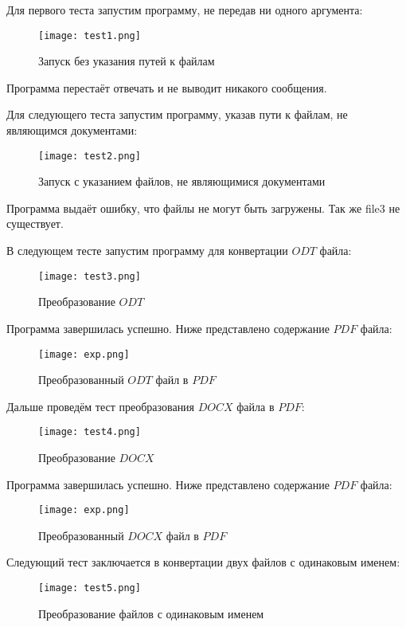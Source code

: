 \documentclass[12pt]{article}
\begin{document}
    Для первого теста запустим программу, не передав ни одного аргумента:
    \begin{figure}[h]
        \texttt{[image: test1.png]}
        \centering
        \caption{Запуск без указания путей к файлам}
    \end{figure}

    Программа перестаёт отвечать и не выводит никакого сообщения.

    Для следующего теста запустим программу, указав пути к файлам, не являющимся документами:
    \begin{figure}[h]
        \texttt{[image: test2.png]}
        \centering
        \caption{Запуск  с  указанием файлов, не являющимися документами}
    \end{figure}

    Программа выдаёт ошибку, что файлы не могут быть загружены. Так же file3 не существует.

    В следующем тесте запустим программу для конвертации $ODT$ файла:
    \begin{figure}[h]
        \texttt{[image: test3.png]}
        \centering
        \caption{Преобразование $ODT$}
    \end{figure}

    \newpage
    Программа завершилась успешно. Ниже представлено содержание $PDF$ файла:
    \begin{figure}[h]
        \texttt{[image: exp.png]}
        \centering
        \caption{Преобразованный $ODT$ файл в $PDF$}
    \end{figure}

    \newpage
    Дальше проведём тест преобразования $DOCX$ файла в $PDF$:
    \begin{figure}[h]
        \texttt{[image: test4.png]}
        \centering
        \caption{Преобразование $DOCX$}
    \end{figure}

    Программа завершилась успешно. Ниже представлено содержание $PDF$ файла:
    \begin{figure}[h]
        \texttt{[image: exp.png]}
        \centering
        \caption{Преобразованный $DOCX$ файл в $PDF$}
    \end{figure}

    \newpage
    Следующий тест заключается в конвертации двух файлов с одинаковым именем:
    \begin{figure}[h]
        \texttt{[image: test5.png]}
        \centering
        \caption{Преобразование файлов с одинаковым именем}
    \end{figure}
\end{document}
